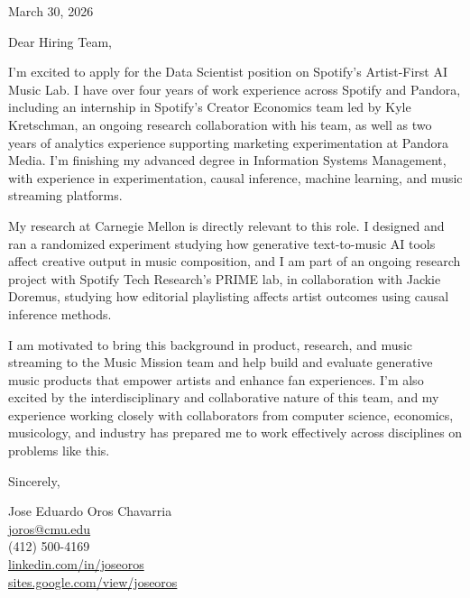 \documentclass[11pt,letterpaper]{article}
\begin{document}
\hfill March 30, 2026

Dear Hiring Team,

I'm excited to apply for the Data Scientist position on Spotify's Artist-First AI Music Lab. I have over four years of work experience across Spotify and Pandora, including an internship in Spotify's Creator Economics team led by Kyle Kretschman, an ongoing research collaboration with his team, as well as two years of analytics experience supporting marketing experimentation at Pandora Media. I'm finishing my advanced degree in Information Systems Management, with experience in experimentation, causal inference, machine learning, and music streaming platforms.

My research at Carnegie Mellon is directly relevant to this role. I designed and ran a randomized experiment studying how generative text-to-music AI tools affect creative output in music composition, and I am part of an ongoing research project with Spotify Tech Research's PRIME lab, in collaboration with Jackie Doremus, studying how editorial playlisting affects artist outcomes using causal inference methods.

I am motivated to bring this background in product, research, and music streaming to the Music Mission team and help build and evaluate generative music products that empower artists and enhance fan experiences. I'm also excited by the interdisciplinary and collaborative nature of this team, and my experience working closely with collaborators from computer science, economics, musicology, and industry has prepared me to work effectively across disciplines on problems like this.

Sincerely,

Jose Eduardo Oros Chavarria \\
\href{mailto:joros@cmu.edu}{joros@cmu.edu} \\
(412) 500-4169 \\
\href{https://www.linkedin.com/in/joseoros}{linkedin.com/in/joseoros} \\
\href{https://sites.google.com/view/joseoros}{sites.google.com/view/joseoros}
\end{document}
